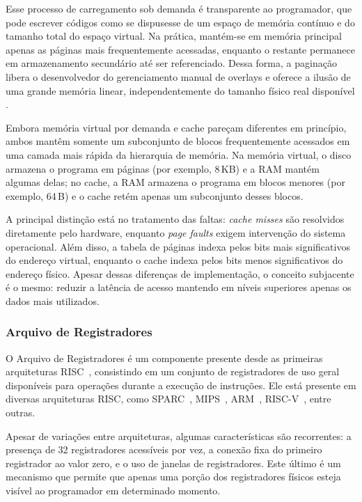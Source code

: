 \documentclass[
	12pt,				%
	openright,			%
	oneside,			%
	a4paper,			%
	english,			%
	french,				%
	spanish,			%
	brazil,				%
	]{abntex2}
\begin{document}
Esse processo de carregamento sob demanda é transparente ao programador, que pode escrever códigos como se dispusesse de um espaço de memória contínuo e do tamanho total do espaço virtual. Na prática, mantém-se em memória principal apenas as páginas mais frequentemente acessadas, enquanto o restante permanece em armazenamento secundário até ser referenciado. Dessa forma, a paginação libera o desenvolvedor do gerenciamento manual de overlays e oferece a ilusão de uma grande memória linear, independentemente do tamanho físico real disponível \cite[p.441]{tanenbaum_structured_2013}.


Embora memória virtual por demanda e cache pareçam diferentes em princípio, ambos mantêm somente um subconjunto de blocos frequentemente acessados em uma camada mais rápida da hierarquia de memória. Na memória virtual, o disco armazena o programa em páginas (por exemplo, 8\,KB) e a RAM mantém algumas delas; no cache, a RAM armazena o programa em blocos menores (por exemplo, 64\,B) e o cache retém apenas um subconjunto desses blocos. \cite[p.462]{tanenbaum_structured_2013}

A principal distinção está no tratamento das faltas: \textit{cache misses} são resolvidos diretamente pelo hardware, enquanto \textit{page faults} exigem intervenção do sistema operacional. Além disso, a tabela de páginas indexa pelos bits mais significativos do endereço virtual, enquanto o cache indexa pelos bits menos significativos do endereço físico. Apesar dessas diferenças de implementação, o conceito subjacente é o mesmo: reduzir a latência de acesso mantendo em níveis superiores apenas os dados mais utilizados. \cite[p.462]{tanenbaum_structured_2013}

\subsubsection{Arquivo de Registradores}
O Arquivo de Registradores é um componente presente desde as primeiras arquiteturas RISC~\cite[p.7-10]{peek_vlsi_1983}, consistindo em um conjunto de registradores de uso geral disponíveis para operações durante a execução de instruções. Ele está presente em diversas arquiteturas RISC, como SPARC~\cite[p.25]{sparc_international_inc_sparc_1994}, MIPS~\cite[p.40-42]{mips_tech_llc_mips32_2016}, ARM~\cite{arm_arm_2014}, RISC-V~\cite[p.20-22]{risc-v_risc-v_2024}, entre outras.

Apesar de variações entre arquiteturas, algumas características são recorrentes: a presença de 32 registradores acessíveis por vez, a conexão fixa do primeiro registrador ao valor zero, e o uso de janelas de registradores. Este último é um mecanismo que permite que apenas uma porção dos registradores físicos esteja visível ao programador em determinado momento.
\end{document}
